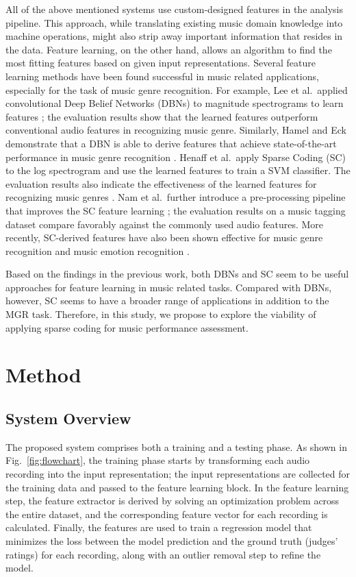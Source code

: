 \documentclass{ws-ijsc}
\begin{document}
All of the above mentioned systems use custom-designed features in the analysis pipeline. This approach, while translating existing music domain knowledge into machine operations, might also strip away important information that resides in the data. Feature learning, on the other hand, allows an algorithm to find the most fitting features based on given input representations. Several feature learning methods have been found successful in music related applications, especially for the task of music genre recognition. For example, Lee et al.\  applied convolutional Deep Belief Networks (DBNs) to magnitude spectrograms to learn features \cite{Lee2009a}; the evaluation results show that the learned features outperform conventional audio features in recognizing music genre. 
Similarly, Hamel and Eck demonstrate that a DBN is able to derive features that achieve state-of-the-art performance in music genre recognition \cite{Hamel2010}. 
Henaff et al.\  apply Sparse Coding (SC) to the log spectrogram and use the learned features to train a SVM classifier. The evaluation results also indicate the effectiveness of the learned features for recognizing music genres \cite{Henaff2011}. 
Nam et al.\  further introduce a pre-processing pipeline that improves the SC feature learning \cite{Nam2012}; the evaluation results on a music tagging dataset compare favorably against the commonly used audio features. More recently, SC-derived features have also been shown effective for music genre recognition \cite{Hsu2016} and music emotion recognition \cite{OBrien2015}. 

Based on the findings in the previous work, both DBNs and SC seem to be useful approaches for feature learning in music related tasks. Compared with DBNs, however, SC seems to have a broader range of applications in addition to the MGR task. Therefore, in this study, we propose to explore the viability of applying sparse coding for music performance assessment.

\section{Method}\label{sec:method}
\subsection{System Overview}
The proposed system comprises both a training and a testing phase. As shown in Fig.~\ref{fig:flowchart}, the training phase starts by transforming each audio recording into the input representation; the input representations are collected for the training data and passed to the feature learning block. In the feature learning step, the feature extractor is derived by solving an optimization problem across the entire dataset, and the corresponding feature vector for each recording is calculated. Finally, the features are used to train a regression model that minimizes the loss between the model prediction and the ground truth (judges' ratings) for each recording, along with an outlier removal step to refine the model. 
\end{document}
